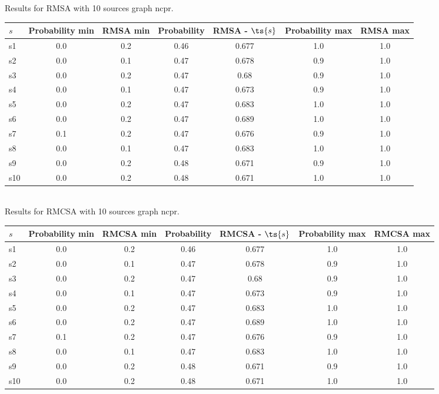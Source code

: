 \documentclass{article}
\begin{document}
\noindent Results for RMSA with 10 sources graph ncpr.

\noindent\begin{tabular}{|l|c|c|c|c|c|c|}
\hline
$s$& Probability min & RMSA min & Probability & RMSA - $\ts{s}$ & Probability max & RMSA max\\
\hline
s1 &0.0 & 0.2 & 0.46 & 0.677 & 1.0 & 1.0\\
\hline
s2 &0.0 & 0.1 & 0.47 & 0.678 & 0.9 & 1.0\\
\hline
s3 &0.0 & 0.2 & 0.47 & 0.68 & 0.9 & 1.0\\
\hline
s4 &0.0 & 0.1 & 0.47 & 0.673 & 0.9 & 1.0\\
\hline
s5 &0.0 & 0.2 & 0.47 & 0.683 & 1.0 & 1.0\\
\hline
s6 &0.0 & 0.2 & 0.47 & 0.689 & 1.0 & 1.0\\
\hline
s7 &0.1 & 0.2 & 0.47 & 0.676 & 0.9 & 1.0\\
\hline
s8 &0.0 & 0.1 & 0.47 & 0.683 & 1.0 & 1.0\\
\hline
s9 &0.0 & 0.2 & 0.48 & 0.671 & 0.9 & 1.0\\
\hline
s10 &0.0 & 0.2 & 0.48 & 0.671 & 1.0 & 1.0\\
\hline
\end{tabular}\\

\noindent Results for RMCSA with 10 sources graph ncpr.

\noindent\begin{tabular}{|l|c|c|c|c|c|c|}
\hline
$s$& Probability min & RMCSA min & Probability & RMCSA - $\ts{s}$ & Probability max & RMCSA max\\
\hline
s1 &0.0 & 0.2 & 0.46 & 0.677 & 1.0 & 1.0\\
\hline
s2 &0.0 & 0.1 & 0.47 & 0.678 & 0.9 & 1.0\\
\hline
s3 &0.0 & 0.2 & 0.47 & 0.68 & 0.9 & 1.0\\
\hline
s4 &0.0 & 0.1 & 0.47 & 0.673 & 0.9 & 1.0\\
\hline
s5 &0.0 & 0.2 & 0.47 & 0.683 & 1.0 & 1.0\\
\hline
s6 &0.0 & 0.2 & 0.47 & 0.689 & 1.0 & 1.0\\
\hline
s7 &0.1 & 0.2 & 0.47 & 0.676 & 0.9 & 1.0\\
\hline
s8 &0.0 & 0.1 & 0.47 & 0.683 & 1.0 & 1.0\\
\hline
s9 &0.0 & 0.2 & 0.48 & 0.671 & 0.9 & 1.0\\
\hline
s10 &0.0 & 0.2 & 0.48 & 0.671 & 1.0 & 1.0\\
\hline
\end{tabular}\\
\end{document}
